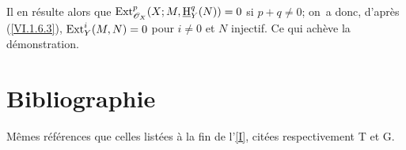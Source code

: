 Il en r\'esulte alors que $\operatorname{Ext}_{\mathscr{O}_X}^p(X;M, \mathop{\underline{\mathrm{H}}}\nolimits_Y^q(N))=0$ si $p+q \neq 0$; on~a donc, d'apr\`es (\ref{VI.1.6.3}), $\operatorname{Ext}_Y^i(M, N)=0$ pour $i\neq 0$ et $N$ injectif. Ce qui ach\`eve la d\'emonstration.

\section*{Bibliographie} M\^emes r\'ef\'erences que celles list\'ees \`a la fin de l'\Exp \ref{I}, cit\'ees respectivement T et G.

